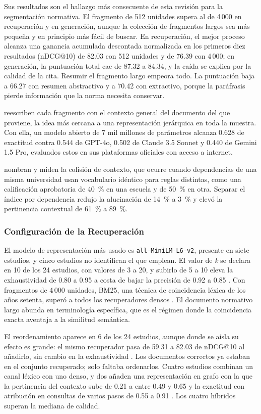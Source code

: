 \documentclass[man,12pt,floatsintext,donotrepeattitle]{apa7}
\begin{document}
Sus resultados son el hallazgo más consecuente de esta revisión para la segmentación normativa. El fragmento de 512 unidades supera al de 4\,000 en recuperación y en generación, aunque la colección de fragmentos largos sea más pequeña y en principio más fácil de buscar. En recuperación, el mejor proceso alcanza una ganancia acumulada descontada normalizada en los primeros diez resultados (nDCG@10) de 82.03 con 512 unidades y de 76.39 con 4\,000; en generación, la puntuación total cae de 87.32 a 84.34, y la caída se explica por la calidad de la cita. Resumir el fragmento largo empeora todo. La puntuación baja a 66.27 con resumen abstractivo y a 70.42 con extractivo, porque la paráfrasis pierde información que la norma necesita conservar.

\textcite{nguyenl2025} reescriben cada fragmento con el contexto general del documento del que proviene, la idea más cercana a una representación jerárquica en toda la muestra. Con ella, un modelo abierto de 7 mil millones de parámetros alcanza 0.628 de exactitud contra 0.544 de GPT-4o, 0.502 de Claude 3.5 Sonnet y 0.440 de Gemini 1.5 Pro, evaluados estos en sus plataformas oficiales con acceso a internet.

\textcite{vurukonda2026} nombran y miden la colisión de contexto, que ocurre cuando dependencias de una misma universidad usan vocabulario idéntico para reglas distintas, como una calificación aprobatoria de 40~\% en una escuela y de 50~\% en otra. Separar el índice por dependencia redujo la alucinación de 14~\% a 3~\% y elevó la pertinencia contextual de 61~\% a 89~\%.

\subsubsection{Configuración de la Recuperación}
El modelo de representación más usado es \texttt{all-MiniLM-L6-v2}, presente en siete estudios, y cinco estudios no identifican el que emplean. El valor de \emph{k} se declara en 10 de los 24 estudios, con valores de 3 a 20, y subirlo de 5 a 10 eleva la exhaustividad de 0.80 a 0.95 a costa de bajar la precisión de 0.92 a 0.85 \parencite{nguyenthidieu2024}. Con fragmentos de 4\,000 unidades, BM25, una técnica de coincidencia léxica de los años setenta, superó a todos los recuperadores densos \parencite{wojtasik2025}. El documento normativo largo abunda en terminología específica, que es el régimen donde la coincidencia exacta aventaja a la similitud semántica.

El reordenamiento aparece en 6 de los 24 estudios, aunque donde se aísla su efecto es grande: el mismo recuperador pasa de 59.31 a 82.03 de nDCG@10 al añadirlo, sin cambio en la exhaustividad \parencite{wojtasik2025}. Los documentos correctos ya estaban en el conjunto recuperado; solo faltaba ordenarlos. Cuatro estudios combinan un canal léxico con uno denso, y dos añaden una representación en grafo con la que la pertinencia del contexto sube de 0.21 a entre 0.49 y 0.65 \parencite{zhong2025} y la exactitud con atribución en consultas de varios pasos de 0.55 a 0.91 \parencite{stepanov2026}. Los cuatro híbridos superan la mediana de calidad.
\end{document}

